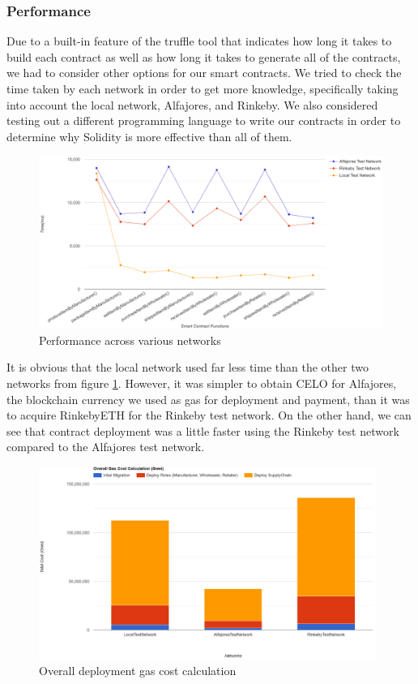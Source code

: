\subsubsection{Performance}

Due to a built-in feature of the truffle tool that indicates how long it takes to build each contract as well as how long it takes to generate all of the contracts, we had to consider other options for our smart contracts. We tried to check the time taken by each network in order to get more knowledge, specifically taking into account the local network, Alfajores, and Rinkeby. We also considered testing out a different programming language to write our contracts in order to determine why Solidity is more effective than all of them.

\begin{figure}[h]
\centering
  \includegraphics[width=13.5cm]{includes/figures/graph.png} 
  \caption{Performance across various networks}
  \label{Testing on networks}
\end{figure}

\vspace{.5cm}

It is obvious that the local network used far less time than the other two networks from figure \ref{Testing on networks}. However, it was simpler to obtain CELO for Alfajores, the blockchain currency we used as gas for deployment and payment, than it was to acquire RinkebyETH for the Rinkeby test network. On the other hand, we can see that contract deployment was a little faster using the Rinkeby test network compared to the Alfajores test network.


\begin{figure}[h]
\centering
  \includegraphics[width=11cm]{includes/figures/totalCost.png} 
  \caption{Overall deployment gas cost calculation }
  \label{Overall Gas Cost calculation}
\end{figure}

